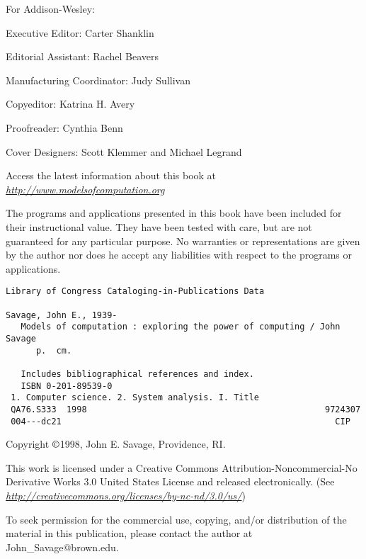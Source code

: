 \documentclass[notitlepage]{article}
\begin{document}
\thispagestyle{empty}

\noindent
For Addison-Wesley:


Executive Editor: Carter Shanklin


Editorial Assistant: Rachel Beavers


Manufacturing Coordinator: Judy Sullivan


Copyeditor: Katrina H. Avery


Proofreader: Cynthia Benn


Cover Designers: Scott Klemmer and Michael Legrand

\vspace{3ex}
\noindent
Access the latest information about this book at 
\href{http://www.modelsofcomputation.org}{{\em http://www.modelsofcomputation.org}}

\vspace{3ex}
\noindent
The programs and applications presented in this book have been included for
their instructional value.  They have been tested with care, but are not
guaranteed for any particular purpose. No warranties or representations are
given by the author nor does he accept any liabilities with respect to the
programs or applications.

\vspace{3ex}
\begin{verbatim}
Library of Congress Cataloging-in-Publications Data

Savage, John E., 1939-
   Models of computation : exploring the power of computing / John Savage
      p.  cm.

   Includes bibliographical references and index.
   ISBN 0-201-89539-0
 1. Computer science. 2. System analysis. I. Title
 QA76.S333  1998                                               9724307
 004---dc21                                                      CIP
\end{verbatim}

\vspace{1ex}
\noindent
Copyright {$\copyright$}1998, John E. Savage, Providence, RI. 

\vspace{2ex}
\noindent
This work is licensed under a Creative Commons
Attribution-Noncommercial-No Derivative Works 3.0 United States
License and released electronically. 
\break
(See \href{http://creativecommons.org/licenses/by-nc-nd/3.0/us/}
{{\em http://creativecommons.org/licenses/by-nc-nd/3.0/us/}})


\vspace{2ex}
\noindent
To seek permission for the commercial use, copying, and/or distribution of the
material in this publication, please contact the author at
John\_Savage@brown.edu.
\end{document}
